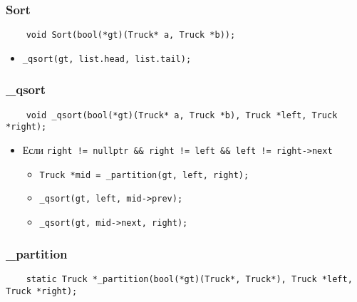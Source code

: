 \subsubsection*{Sort}

\begin{lstlisting}
    void Sort(bool(*gt)(Truck* a, Truck *b));
\end{lstlisting}

\begin{itemize}
        \item \verb|_qsort(gt, list.head, list.tail);|
\end{itemize}



\subsubsection*{\_qsort}

\begin{lstlisting}
    void _qsort(bool(*gt)(Truck* a, Truck *b), Truck *left, Truck *right);
\end{lstlisting}

\begin{itemize}
	\item Если \verb|right != nullptr && right != left && left != right->next|
		\begin{itemize}
			\item \verb|Truck *mid = _partition(gt, left, right);|
			\item \verb|_qsort(gt, left, mid->prev);|
			\item \verb|_qsort(gt, mid->next, right);|
		\end{itemize}
\end{itemize}



\subsubsection*{\_partition}

\begin{lstlisting}
    static Truck *_partition(bool(*gt)(Truck*, Truck*), Truck *left, Truck *right);
\end{lstlisting}

